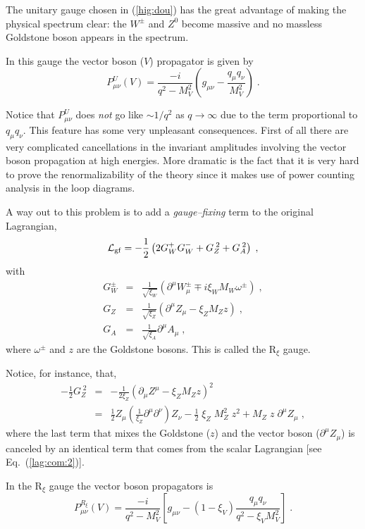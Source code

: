 \documentclass[12pt]{report}
\def\text#1{{\scriptstyle\mathrm{#1}}}
\newcommand{\lag}{{\cal L}}
\newcommand{\del}{\partial}
\begin{document}
The unitary gauge chosen in (\ref{hig:dou}) has the great
advantage of making the physical spectrum clear: the $W^\pm$ and $Z^0$
become massive and no massless Goldstone boson appears in the
spectrum. 

In this gauge the vector boson ($V$) propagator is given by 
\[
P_{\mu\nu}^U (V) = \frac{-i}{q^2 - M_V^2} \left(g_{\mu\nu} -
{ \frac{q_{\mu} q_{\nu}}{M_V^2} } \right) \; .
\]

Notice that $P_{\mu\nu}^U$ does {\it not} go like $\sim 1/q^2$ as $q
\to \infty$ due to the term proportional to $q_{\mu} q_{\nu}$. This
feature has some very unpleasant consequences. First of all there are
very complicated cancellations in the invariant amplitudes involving
the vector boson propagation at high energies. More dramatic is the
fact that it is very hard to prove the renormalizability of the
theory since it makes use of power counting analysis in the loop
diagrams. 

A way out to this problem \cite{Hooft:71,Fujikawa:72} is to add a {\it
gauge--fixing} term to the original Lagrangian,
\[
\lag_{\text{gf}} = -\frac{1}{2} 
\left(2 G_W^+ G_W^- + G_Z^{\; 2} + G_A^{\; 2} \right) \; ,
\]
with
\begin{eqnarray*}
 G_W^\pm &=& \frac{1}{\sqrt{\xi_W}} \left(\del^\mu W^\pm_\mu \mp i
\xi_W M_W \omega^\pm  \right) \; , \\
 G_Z &=& \frac{1}{\sqrt{\xi_Z}} \left(\del^\mu Z_\mu - 
\xi_Z M_Z z  \right) \; , \\
G_A &=& \frac{1}{\sqrt{\xi_A}} \del^\mu A_\mu \; ,
\end{eqnarray*}
where $ \omega^\pm$ and $z$ are the Goldstone bosons. This is called
the R$_\xi$ gauge.

Notice, for instance, that, 
\begin{eqnarray*}
- \frac{1}{2} G_Z^{\; 2} &=& -  \frac{1}{2 \xi_Z} (\del_\mu Z^\mu -
\xi_Z M_Z z)^2 \\
&=& \frac{1}{2} Z_\mu \left( \frac{1}{\xi_Z} \del^\mu \del^\nu
\right)Z_\nu
- \frac{1}{2} \; \xi_Z \; M_Z^2 \; z^2 + M_Z \; z \; \del^\mu Z_\mu \; ,
\end{eqnarray*}
where the last term that mixes the Goldstone ($z$) and the vector
boson ($\del^\mu Z_\mu$) is canceled by an identical term that comes
from the scalar Lagrangian [see Eq.\ (\ref{lag:com:2})]. 

In the R$_\xi$ gauge the vector boson propagators is
\begin{equation}
P_{\mu\nu}^{R_\xi} (V) = \frac{-i}{q^2 - M_V^2} \left[ g_{\mu\nu} -
(1 - \xi_V) \frac{q_{\mu} q_{\nu}}{q^2 - \xi_V M_V^2} \right] \; .
\label{rx}
\end{equation}
\end{document}
